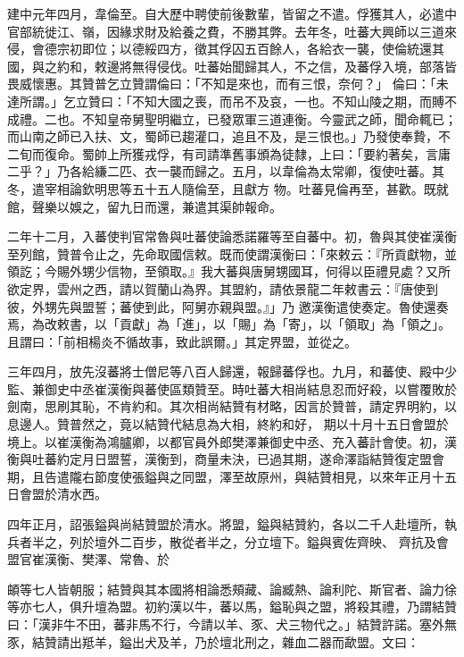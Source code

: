 \begin{pinyinscope}
 建中元年四月，韋倫至。自大歷中聘使前後數輩，皆留之不遣。俘獲其人，必遣中官部統徙江、嶺，因緣求財及給養之費，不勝其弊。去年冬，吐蕃大興師以三道來侵，會德宗初即位；以德綏四方，徵其俘囚五百餘人，各給衣一襲，使倫統還其國，與之約和，敕邊將無得侵伐。吐蕃始聞歸其人，不之信，及蕃俘入境，部落皆畏威懷惠。其贊普乞立贊謂倫曰：「不知是來也，而有三恨，奈何？」
 倫曰：「未達所謂。」乞立贊曰：「不知大國之喪，而吊不及哀，一也。不知山陵之期，而賻不成禮。二也。不知皇帝舅聖明繼立，已發眾軍三道連衡。今靈武之師，聞命輒已；而山南之師已入扶、文，蜀師已趨灌口，追且不及，是三恨也。」乃發使奉贄，不二旬而復命。蜀帥上所獲戎俘，有司請準舊事頒為徒隸，上曰：「要約著矣，言庸二乎？」乃各給縑二匹、衣一襲而歸之。五月，以韋倫為太常卿，復使吐蕃。其冬，遣宰相論欽明思等五十五人隨倫至，且獻方
 物。吐蕃見倫再至，甚歡。既就館，聲樂以娛之，留九日而還，兼遣其渠帥報命。



 二年十二月，入蕃使判官常魯與吐蕃使論悉諾羅等至自蕃中。初，魯與其使崔漢衡至列館，贊普令止之，先命取國信敕。既而使謂漢衡曰：「來敕云：『所貢獻物，並領訖；今賜外甥少信物，至領取。』我大蕃與唐舅甥國耳，何得以臣禮見處？又所欲定界，雲州之西，請以賀蘭山為界。其盟約，請依景龍二年敕書云：『唐使到彼，外甥先與盟誓；蕃使到此，阿舅亦親與盟。』」乃
 邀漢衡遣使奏定。魯使還奏焉，為改敕書，以「貢獻」為「進」，以「賜」為「寄」，以「領取」為「領之」。且謂曰：「前相楊炎不循故事，致此誤爾。」其定界盟，並從之。



 三年四月，放先沒蕃將士僧尼等八百人歸還，報歸蕃俘也。九月，和蕃使、殿中少監、兼御史中丞崔漢衡與蕃使區類贊至。時吐蕃大相尚結息忍而好殺，以嘗覆敗於劍南，思刷其恥，不肯約和。其次相尚結贊有材略，因言於贊普，請定界明約，以息邊人。贊普然之，竟以結贊代結息為大相，終約和好，
 期以十月十五日會盟於境上。以崔漢衡為鴻臚卿，以都官員外郎樊澤兼御史中丞、充入蕃計會使。初，漢衡與吐蕃約定月日盟誓，漢衡到，商量未決，已過其期，遂命澤詣結贊復定盟會期，且告遣隴右節度使張鎰與之同盟，澤至故原州，與結贊相見，以來年正月十五日會盟於清水西。



 四年正月，詔張鎰與尚結贊盟於清水。將盟，鎰與結贊約，各以二千人赴壇所，執兵者半之，列於壇外二百步，散從者半之，分立壇下。鎰與賓佐齊映、
 齊抗及會盟官崔漢衡、樊澤、常魯、於



 頔等七人皆朝服；結贊與其本國將相論悉頰藏、論臧熱、論利陀、斯官者、論力徐等亦七人，俱升壇為盟。初約漢以牛，蕃以馬，鎰恥與之盟，將殺其禮，乃謂結贊曰：「漢非牛不田，蕃非馬不行，今請以羊、豕、犬三物代之。」結贊許諾。塞外無豕，結贊請出羝羊，鎰出犬及羊，乃於壇北刑之，雜血二器而歃盟。文曰：




\end{pinyinscope}
